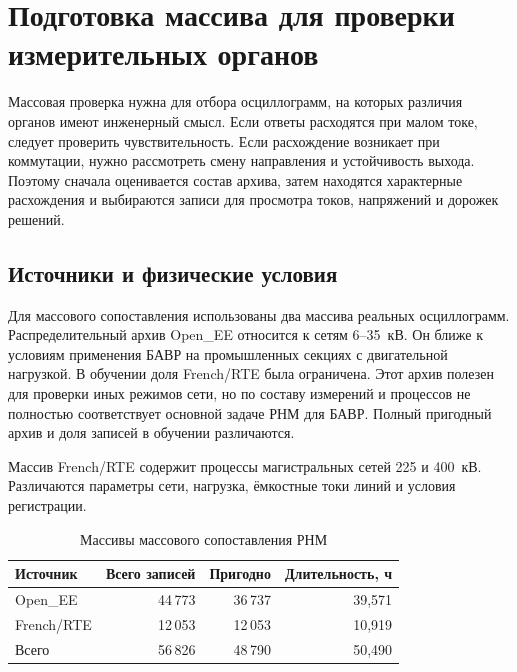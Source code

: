 \section{Подготовка массива для проверки измерительных органов}
\label{sec:ch5_population_audit}

Массовая проверка нужна для отбора осциллограмм, на которых
различия органов имеют инженерный смысл. Если ответы расходятся
при малом токе, следует проверить чувствительность. Если расхождение
возникает при коммутации, нужно рассмотреть смену направления
и устойчивость выхода. Поэтому сначала оценивается состав архива,
затем находятся характерные расхождения и выбираются записи
для просмотра токов, напряжений и дорожек решений.

\subsection{Источники и физические условия}

Для массового сопоставления использованы два массива
реальных осциллограмм. Распределительный архив Open\_EE
относится к сетям 6--35~кВ. Он ближе к условиям применения
БАВР на промышленных секциях с двигательной нагрузкой.
В обучении доля French/RTE была ограничена. Этот архив полезен
для проверки иных режимов сети, но по составу измерений и процессов
не полностью соответствует основной задаче РНМ для БАВР.
Полный пригодный архив и доля записей в обучении различаются.

Массив French/RTE содержит процессы магистральных сетей
225 и 400~кВ. Различаются параметры сети, нагрузка,
ёмкостные токи линий и условия регистрации.

\begin{table}[htbp]
\centering\small
\caption{Массивы массового сопоставления РНМ}
\label{tab:ch5_population}
\begin{tabular}{lrrr}
\toprule
Источник & Всего записей & Пригодно & Длительность, ч \\
\midrule
Open\_EE & 44\,773 & 36\,737 & 39,571 \\
French/RTE & 12\,053 & 12\,053 & 10,919 \\
Всего & 56\,826 & 48\,790 & 50,490 \\
\bottomrule
\end{tabular}
\end{table}

